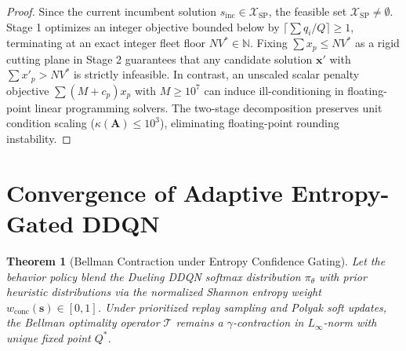 \documentclass{article}
\newtheorem{theorem}{Theorem}
\begin{document}
\begin{proof}
Since the current incumbent solution $s_{\text{inc}} \in \mathcal{X}_{\text{SP}}$, the feasible set $\mathcal{X}_{\text{SP}} \neq \emptyset$. Stage 1 optimizes an integer objective bounded below by $\lceil \sum q_i / Q \rceil \ge 1$, terminating at an exact integer fleet floor $NV^* \in \mathbb{N}$. Fixing $\sum x_p \le NV^*$ as a rigid cutting plane in Stage 2 guarantees that any candidate solution $\mathbf{x}'$ with $\sum x'_p > NV^*$ is strictly infeasible. In contrast, an unscaled scalar penalty objective $\sum (M + c_p) x_p$ with $M \ge 10^7$ can induce ill-conditioning in floating-point linear programming solvers. The two-stage decomposition preserves unit condition scaling ($\kappa(\mathbf{A}) \le 10^3$), eliminating floating-point rounding instability.
\end{proof}

\section{Convergence of Adaptive Entropy-Gated DDQN}

\begin{theorem}[Bellman Contraction under Entropy Confidence Gating]
Let the behavior policy blend the Dueling DDQN softmax distribution $\pi_{\theta}$ with prior heuristic distributions via the normalized Shannon entropy weight $w_{\text{conc}}(\mathbf{s}) \in [0, 1]$. Under prioritized replay sampling and Polyak soft updates, the Bellman optimality operator $\mathcal{T}$ remains a $\gamma$-contraction in $L_\infty$-norm with unique fixed point $Q^*$.
\end{theorem}
\end{document}
